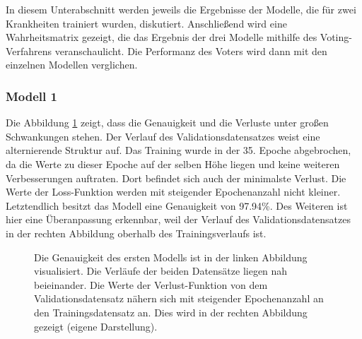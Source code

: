 In diesem Unterabschnitt werden jeweils die Ergebnisse der Modelle, die für zwei Krankheiten trainiert wurden, diskutiert. Anschließend wird eine Wahrheitsmatrix gezeigt, die das Ergebnis der drei Modelle mithilfe des Voting-Verfahrens veranschaulicht. Die Performanz des Voters wird dann mit den einzelnen Modellen verglichen.


\subsubsection{Modell 1}

Die Abbildung \ref{eval_acc_loss_voter1} zeigt, dass die Genauigkeit und die Verluste unter großen Schwankungen stehen. Der Verlauf des Validationsdatensatzes weist eine alternierende Struktur auf. Das Training wurde in der 35. Epoche abgebrochen, da die Werte zu dieser Epoche auf der selben Höhe liegen und keine weiteren Verbesserungen auftraten. Dort befindet sich auch der minimalste Verlust. Die Werte der Loss-Funktion werden mit steigender Epochenanzahl nicht kleiner. Letztendlich besitzt das Modell eine Genauigkeit von 97.94\%. Des Weiteren ist hier eine Überanpassung erkennbar, weil der Verlauf des Validationsdatensatzes in der rechten Abbildung oberhalb des Trainingsverlaufs ist.


\begin{figure}[h!]
	
	\hfill
	\hfill
	\hfill
	\caption{Die Genauigkeit des ersten Modells ist in der linken Abbildung visualisiert. Die Verläufe der beiden Datensätze liegen nah beieinander. Die Werte der Verlust-Funktion von dem Validationsdatensatz nähern sich mit steigender Epochenanzahl an den Trainingsdatensatz an. Dies wird in der rechten Abbildung gezeigt (eigene Darstellung).
	}
	\label{eval_acc_loss_voter1}
\end{figure}

